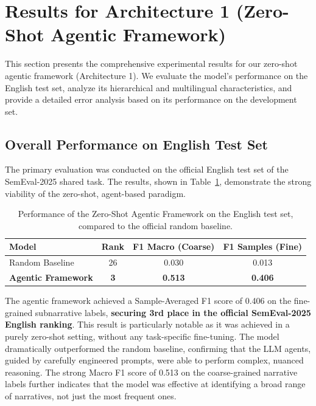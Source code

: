 \section{Results for Architecture 1 (Zero-Shot Agentic Framework)}

This section presents the comprehensive experimental results for our zero-shot agentic framework (Architecture 1). We evaluate the model's performance on the English test set, analyze its hierarchical and multilingual characteristics, and provide a detailed error analysis based on its performance on the development set.

\subsection{Overall Performance on English Test Set}

The primary evaluation was conducted on the official English test set of the SemEval-2025 shared task. The results, shown in Table~\ref{tab:agentic-performance}, demonstrate the strong viability of the zero-shot, agent-based paradigm.

\begin{table}[htbp]
\centering
\caption{Performance of the Zero-Shot Agentic Framework on the English test set, compared to the official random baseline.}
\label{tab:agentic-performance}
\begin{tabular}{lccc}
\toprule
\textbf{Model} & \textbf{Rank} & \textbf{F1 Macro (Coarse)} & \textbf{F1 Samples (Fine)} \\
\midrule
Random Baseline & 26 & 0.030 & 0.013 \\
\textbf{Agentic Framework} & \textbf{3} & \textbf{0.513} & \textbf{0.406} \\
\bottomrule
\end{tabular}
\end{table}

The agentic framework achieved a Sample-Averaged F1 score of 0.406 on the fine-grained subnarrative labels, \textbf{securing 3rd place in the official SemEval-2025 English ranking}. This result is particularly notable as it was achieved in a purely zero-shot setting, without any task-specific fine-tuning. The model dramatically outperformed the random baseline, confirming that the LLM agents, guided by carefully engineered prompts, were able to perform complex, nuanced reasoning. The strong Macro F1 score of 0.513 on the coarse-grained narrative labels further indicates that the model was effective at identifying a broad range of narratives, not just the most frequent ones.

